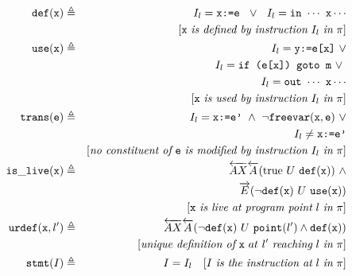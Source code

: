 \begin{figure}[hb]
\vspace{-3mm}
\begin{small}
\begin{eqnarray*}
\wdef(\wx) & \triangleq & I_l= \texttt{x:=e} ~~ \vee ~~ I_l= \texttt{in} ~ \cdots ~ \texttt{x} \cdots \\
                            &            & [\wx ~ \textit{is defined by instruction} ~ I_l ~ \textit{in} ~ \pi] \\
\wuse(\wx) & \triangleq & I_l= \texttt{y:=e[x]} ~ \vee  \\
                            &            & I_l= \texttt{if (e[x]) goto m} ~ \vee \ \\
                            &            & I_l= \texttt{out} ~ \cdots ~ \texttt{x} \cdots \\
                            &            & [\wx ~ \textit{is used by instruction} ~ I_l ~ \textit{in} ~ \pi] \\
\wtrans(\we) & \triangleq & I_l= \texttt{x:=e'} ~ \wedge ~ \neg\wfreevar(\wx,\we) ~ \vee \\
                            &            & I_l\neq\texttt{x:=e'} \\
                            &            & [\textit{no constituent of}~\we~\textit{is modified by instruction} ~ I_l ~ \textit{in} ~ \pi] \\
\islive(\wx) & \triangleq & \overleftarrow{AX}\overleftarrow{A}(\text{true} ~ U ~ \wdef(\wx)) ~ \wedge \\
                            &            & \overrightarrow{E}(\neg\wdef(\wx) ~ U ~ \wuse(\wx)) \\
                            &            & [\wx ~ \textit{is live at program point} ~ l ~ \textit{in} ~ \pi] \\
\ureachdef(\wx,l') & \triangleq & \overleftarrow{AX}\overleftarrow{A}(\neg\wdef(\wx) ~ U ~ \point(l')\wedge\wdef(\wx)) \\
                            &            & [\textit{unique definition of}~\wx~{at}~l'~\textit{reaching}~l~\textit{in} ~ \pi] \\
\stmt(I) & \triangleq & I=I_l ~~~ [I ~ \textit{is the instruction at} ~ l ~ \textit{in} ~ \pi]\\

\end{eqnarray*}
\end{small}
\end{figure}
